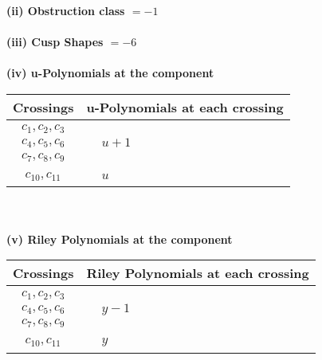 \documentclass[1p]{elsarticle_modified}
\theoremstyle{definition}
\begin{document}
\flushleft \textbf{(ii) Obstruction class $= -1$}\\~\\
\flushleft \textbf{(iii) Cusp Shapes $= -6$}\\~\\
\newpage\renewcommand{\arraystretch}{1}
\flushleft \textbf{(iv) u-Polynomials at the component}\newline \\
\begin{tabular}{m{50pt}|m{274pt}}
Crossings & \hspace{64pt}u-Polynomials at each crossing \\
\hline $$\begin{aligned}c_{1},c_{2},c_{3}\\c_{4},c_{5},c_{6}\\c_{7},c_{8},c_{9}\end{aligned}$$&$\begin{aligned}
&u+1
\end{aligned}$\\
\hline $$\begin{aligned}c_{10},c_{11}\end{aligned}$$&$\begin{aligned}
&u
\end{aligned}$\\
\hline
\end{tabular}\\~\\
\newpage\renewcommand{\arraystretch}{1}
\flushleft \textbf{(v) Riley Polynomials at the component}\newline \\
\begin{tabular}{m{50pt}|m{274pt}}
Crossings & \hspace{64pt}Riley Polynomials at each crossing \\
\hline $$\begin{aligned}c_{1},c_{2},c_{3}\\c_{4},c_{5},c_{6}\\c_{7},c_{8},c_{9}\end{aligned}$$&$\begin{aligned}
&y-1
\end{aligned}$\\
\hline $$\begin{aligned}c_{10},c_{11}\end{aligned}$$&$\begin{aligned}
&y
\end{aligned}$\\
\hline
\end{tabular}\\~\\
\end{document}
